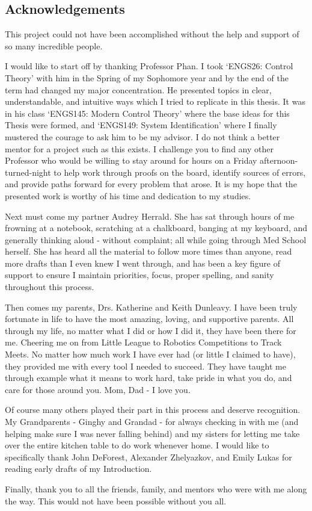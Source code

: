 \pagestyle{plain}
\begin{center}


\section*{Acknowledgements}


\end{center}
This project could not have been accomplished without the help and support of so many incredible people.

I would like to start off by thanking Professor Phan. I took `ENGS26: Control Theory' with him in the Spring of my Sophomore year and by the end of the term had changed my major concentration. He presented topics in clear, understandable, and intuitive ways which I tried to replicate in this thesis. It was in his class `ENGS145: Modern Control Theory' where the base ideas for this Thesis were formed, and `ENGS149: System Identification' where I finally mustered the courage to ask him to be my advisor. I do not think a better mentor for a project such as this exists. I challenge you to find any other Professor who would be willing to stay around for hours on a Friday afternoon-turned-night to help work through proofs on the board, identify sources of errors, and provide paths forward for every problem that arose. It is my hope that the presented work is worthy of his time and dedication to my studies.

Next must come my partner Audrey Herrald. She has sat through hours of me frowning at a notebook, scratching at a chalkboard, banging at my keyboard, and generally thinking aloud - without complaint; all while going through Med School herself. She has heard all the material to follow more times than anyone, read more drafts than I even knew I went through, and has been a key figure of support to ensure I maintain priorities, focus, proper spelling, and sanity throughout this process. 

Then comes my parents, Drs. Katherine and Keith Dunleavy. I have been truly fortunate in life to have the most amazing, loving, and supportive parents. All through my life, no matter what I did or how I did it, they have been there for me. Cheering me on from Little League to Robotics Competitions to Track Meets. No matter how much work I have ever had (or little I claimed to have), they provided me with every tool I needed to succeed. They have taught me through example what it means to work hard, take pride in what you do, and care for those around you. Mom, Dad - I love you.

Of course many others played their part in this process and deserve recognition. My Grandparents - Ginghy and Grandad - for always checking in with me (and helping make sure I was never falling behind) and my sisters for letting me take over the entire kitchen table to do work whenever home. I would like to specifically thank John DeForest, Alexander Zhelyazkov, and Emily Lukas for reading early drafts of my Introduction.  

Finally, thank you to all the friends, family, and mentors who were with me along the way. This would not have been possible without you all.
\cleardoublepage%
